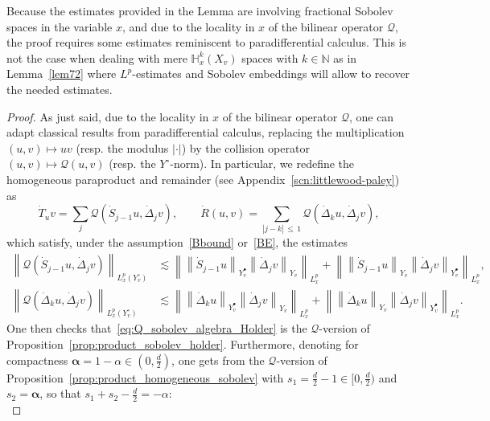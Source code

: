 \documentclass[AHL,Unicode,longabstracts,published]{cedram}
\newcommand{\N}{\mathbb{N}}
\newcommand{\bbH}{\mathbb{H}}
\newcommand{\QQ}{\mathcal{Q}}
\newcommand{\Sg}{Y}
\newcommand{\Sgp}{Y^{\bullet}}
\newcommand{\Sgm}{Y^{\circ}}
\renewcommand*\le{\leqslant}
\begin{document}
\begin{rema}
Because the estimates provided in the Lemma are involving fractional Sobolev spaces in the variable $x$, and due to the locality in $x$ of the bilinear operator $\QQ$, the proof requires some estimates reminiscent to paradifferential calculus. This is not the case when dealing with mere $\bbH^{k}_{x}(X_{v})$ spaces with $k \in \N$ as in Lemma~\ref{lem72} where $L^{p}$-estimates and Sobolev embeddings will allow to recover the needed estimates.
\end{rema}

\begin{proof}
As just said, due to the locality in $x$ of the bilinear operator $\QQ$, one can adapt classical results from paradifferential calculus, replacing the multiplication $(u, v) \mapsto uv$ (resp. the modulus $|\cdot|$) by the collision operator $(u, v) \mapsto \QQ(u, v)$ (resp. the $\Sgm$-norm). In particular, we redefine the homogeneous paraproduct and remainder (see Appendix~\ref{scn:littlewood-paley}) as
\[
\dot{T}_u v= \sum_{j} \QQ\left(\dot{S}_{j-1} u, \dot{\Delta}_j v \right), \qquad \dot{R}(u, v) = \sum_{|j - k|\,\le\,1} \QQ\left(\dot{\Delta}_k u, \dot{\Delta}_j v \right),
\]
which satisfy, under the assumption~\eqref{Bbound} or~\eqref{BE}, the estimates
\begin{align*}
\left\| \QQ\left(\dot{S}_{j-1} u, \dot{\Delta}_j v \right) \right\|_{ L^p_x \left(\Sgm_v \right) } &\lesssim
\left\| \left\| \dot{S}_{j-1} u \right\|_{ \Sgp_v } \left\| \dot{\Delta}_j v \right\|_{ \Sg_v } \right\|_{ L^p_x } +
\left\| \left\| \dot{S}_{j-1} u \right\|_{ \Sg_v } \left\| \dot{\Delta}_j v \right\|_{ \Sgp_v } \right\|_{ L^p_x },
\\
\left\| \QQ\left(\dot{\Delta}_k u, \dot{\Delta}_j v \right) \right\|_{ L^p_x \left(\Sgm_v \right) } &\lesssim
\left\| \left\| \dot{\Delta}_k u \right\|_{ \Sgp_v } \left\| \dot{\Delta}_j v \right\|_{ \Sg_v } \right\|_{ L^p_x } +
\left\| \left\| \dot{\Delta}_k u \right\|_{ \Sg_v } \left\| \dot{\Delta}_j v \right\|_{ \Sgp_v } \right\|_{ L^p_x }.
\end{align*}
One then checks that~\eqref{eq:Q_sobolev_algebra_Holder} is the $\QQ$-version of Proposition~\ref{prop:product_sobolev_holder}. Furthermore, denoting for compactness $\boldsymbol{\alpha} = 1-\alpha \in (0, \frac{d}{2})$, one gets from the $\QQ$-version of Proposition~\ref{prop:product_homogeneous_sobolev} with $s_1 = \frac{d}{2} -1 \in [0, \frac{d}{2})$ and $s_2 = \boldsymbol{\alpha}$, so that $s_1 + s_2 - \frac{d}{2} = - \alpha$:
\begin{equation*}

\end{equation*}
\end{proof}
\end{document}
